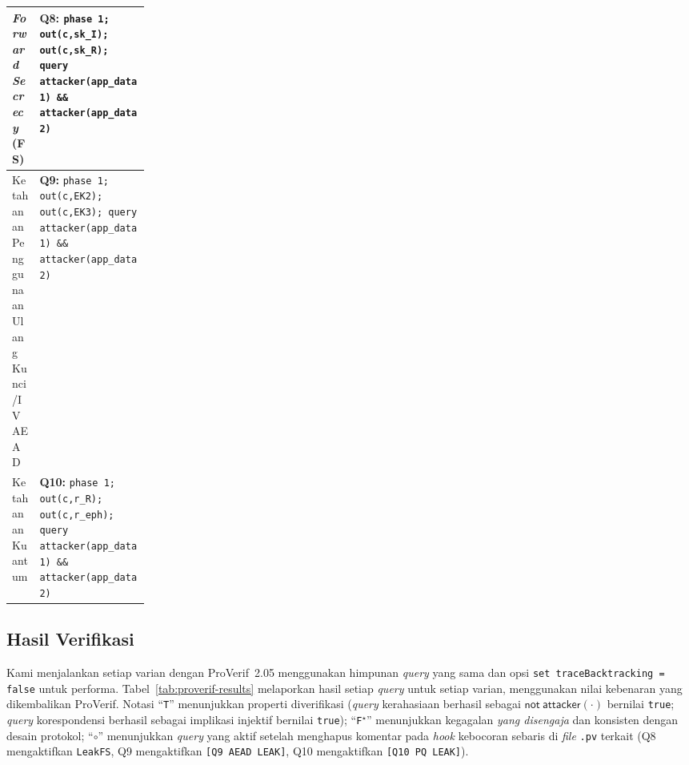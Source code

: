 \documentclass{easychair}
\begin{document}
\begin{table}[t]
\begin{tabularx}{\linewidth}{%
  >{\raggedright\arraybackslash}p{0.20\linewidth}
  >{\raggedright\arraybackslash}X}
\emph{Forward Secrecy} (FS) &
\textbf{Q8:} \texttt{phase 1; out(c,sk\_I); out(c,sk\_R); query
attacker(app\_data1) \&\& attacker(app\_data2)} \\
\cmidrule(lr){1-2}

Ketahanan Penggunaan Ulang Kunci/IV AEAD &
\textbf{Q9:} \texttt{phase 1; out(c,EK2); out(c,EK3); query
attacker(app\_data1) \&\& attacker(app\_data2)} \\
\cmidrule(lr){1-2}

Ketahanan Kuantum &
\textbf{Q10:} \texttt{phase 1; out(c,r\_R); out(c,r\_eph); query
attacker(app\_data1) \&\& attacker(app\_data2)} \\
\bottomrule
\end{tabularx}
\end{table}

\subsection{Hasil Verifikasi}
Kami menjalankan setiap varian dengan ProVerif~2.05 menggunakan
himpunan \emph{query} yang sama dan opsi
\texttt{set traceBacktracking = false} untuk performa.
Tabel~\ref{tab:proverif-results} melaporkan hasil setiap \emph{query}
untuk setiap varian, menggunakan nilai kebenaran yang dikembalikan
ProVerif. Notasi ``\texttt{T}'' menunjukkan properti diverifikasi
(\emph{query} kerahasiaan berhasil sebagai $\mathsf{not\ attacker(\cdot)}$
bernilai \texttt{true}; \emph{query} korespondensi berhasil sebagai
implikasi injektif bernilai \texttt{true}); ``\texttt{F$^\star$}''
menunjukkan kegagalan \emph{yang disengaja} dan konsisten dengan
desain protokol; ``$\circ$'' menunjukkan \emph{query} yang aktif
setelah menghapus komentar pada \emph{hook} kebocoran sebaris di
\emph{file} \texttt{.pv} terkait (Q8 mengaktifkan \texttt{LeakFS}, Q9
mengaktifkan \texttt{[Q9 AEAD LEAK]}, Q10 mengaktifkan
\texttt{[Q10 PQ LEAK]}).
\end{document}
